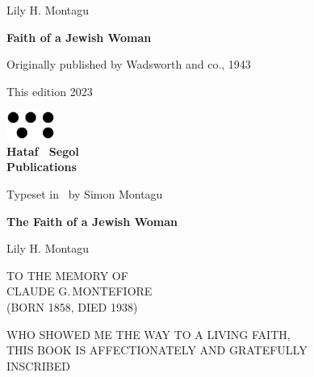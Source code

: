 \frontmatter
\pagestyle{empty}

\vspace*{2\baselineskip}
\begin{center}
  Lily H. Montagu

  \vspace*{2\baselineskip}
  \textbf{Faith of a Jewish Woman}
\end{center}

\clearpage

\begin{center}
  \vspace{2\baselineskip}
  
  \small Originally published by Wadsworth and co., 1943

  This edition 2023
  \vspace*{22\baselineskip}

  \includegraphics[width=16mm]{hatafSegolLogoNoText.png}\\
  
  {
    \Large\bfseries Hataf \ Segol\\Publications
  }

  \vspace{1\baselineskip}
  \small
  Typeset in \XeLaTeX\ by Simon Montagu
  \end{center}

\clearpage
 
{
  \vspace*{4\baselineskip}

  \centering\LARGE\bfseries The Faith of a Jewish Woman

  \vspace{2\baselineskip}

  \Large Lily H. Montagu
  
}

\cleardoublepage
\tableofcontents*

\clearpage
{
  \vspace*{4\baselineskip}

  \centering\large
TO THE MEMORY OF\\ 
CLAUDE G.\,MONTEFIORE\\
(BORN 1858, DIED 1938)

\vspace{2\baselineskip}

WHO SHOWED ME THE WAY TO A LIVING FAITH,\\
THIS BOOK IS AFFECTIONATELY AND GRATEFULLY\\
INSCRIBED

}

\clearpage

